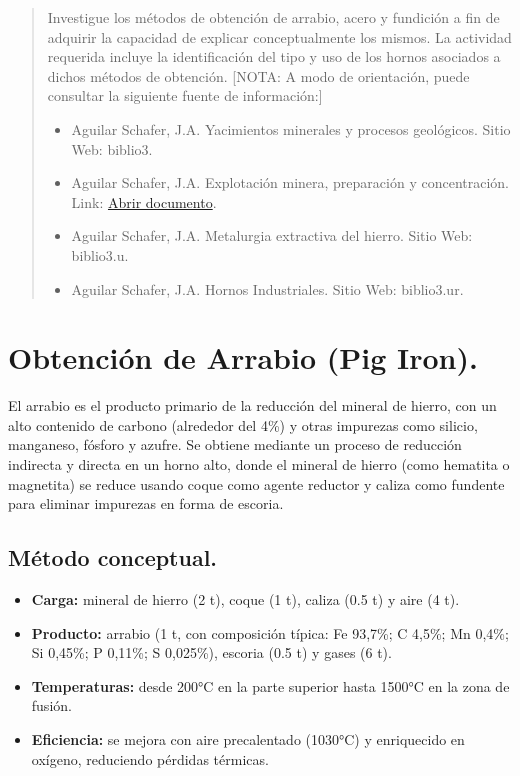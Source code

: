 \documentclass[12pt,a4paper]{article}
\begin{document}

\newpage
\tableofcontents

\begin{abstract}
    Investigue los métodos de obtención de arrabio, acero y fundición a fin de adquirir la capacidad de explicar conceptualmente los mismos. La actividad requerida incluye la identificación del tipo y uso de los hornos asociados a dichos métodos de obtención. [NOTA: A modo de orientación, puede consultar la siguiente fuente de información:]
    \begin{itemize}
        \item Aguilar Schafer, J.A. Yacimientos minerales y procesos geológicos. Sitio Web: biblio3.
        \item Aguilar Schafer, J.A. Explotación minera, preparación y concentración. Link: \href{run:2_240831_204954.pdf}{Abrir documento}.
        \item Aguilar Schafer, J.A. Metalurgia extractiva del hierro. Sitio Web: biblio3.u.
        \item Aguilar Schafer, J.A. Hornos Industriales. Sitio Web: biblio3.ur.
    \end{itemize}
\end{abstract}

\section{Obtención de Arrabio (Pig Iron).}

El arrabio es el producto primario de la reducción del mineral de hierro, con un alto contenido de carbono (alrededor del 4\%) y otras impurezas como silicio, manganeso, fósforo y azufre. Se obtiene mediante un proceso de reducción indirecta y directa en un horno alto, donde el mineral de hierro (como hematita o magnetita) se reduce usando coque como agente reductor y caliza como fundente para eliminar impurezas en forma de escoria.

\subsection{Método conceptual.}

\begin{itemize}
    \item \textbf{Carga:} mineral de hierro (2 t), coque (1 t), caliza (0.5 t) y aire (4 t).
    \item \textbf{Producto:} arrabio (1 t, con composición típica: Fe 93,7\%; C 4,5\%; Mn 0,4\%; Si 0,45\%; P 0,11\%; S 0,025\%), escoria (0.5 t) y gases (6 t).
    \item \textbf{Temperaturas:} desde 200°C en la parte superior hasta 1500°C en la zona de fusión.
    \item \textbf{Eficiencia:} se mejora con aire precalentado (1030°C) y enriquecido en oxígeno, reduciendo pérdidas térmicas.
\end{itemize}
\end{document}
